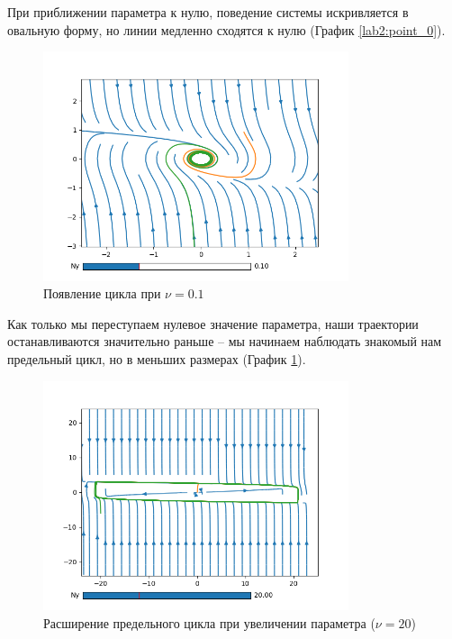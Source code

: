 При приближении параметра к нулю, поведение системы искривляется в овальную форму,
но линии медленно сходятся к нулю (График \ref{lab2:point_0}).

\begin{figure}[!ht]
    \centering
    \includegraphics[width=0.8\textwidth]{figures/2_cycle_0_1}
    \caption{Появление цикла при $\nu = 0.1$}
    \label{lab2:cycle_0_1}
\end{figure}

Как только мы переступаем нулевое значение параметра, наши траектории останавливаются значительно
раньше -- мы начинаем наблюдать знакомый нам предельный цикл, но в меньших размерах (График \ref{lab2:cycle_0_1}).

\begin{figure}[!ht]
    \centering
    \includegraphics[width=0.8\textwidth]{figures/2_cycle_20}
    \caption{Расширение предельного цикла при увеличении параметра ($\nu = 20$)}
    \label{lab2:cycle_20}
\end{figure}


